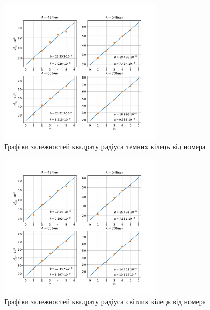 \begin{figure}[h!]    
    \centering
    \includegraphics[width=0.7\textwidth]{assets/r_dark(m).pdf}
    \caption{Графіки залежностей квадрату радіуса темних кілець від номера}
\end{figure}
\begin{figure}[h!]
    \centering
    \includegraphics[width=0.7\textwidth]{assets/r_light(m).pdf}
    \caption{Графіки залежностей квадрату радіуса світлих кілець від номера}
\end{figure}

\pagebreak